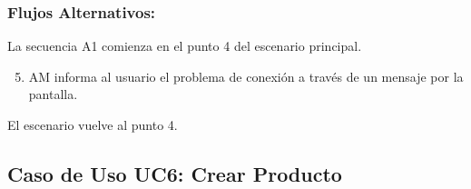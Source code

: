 \begin{framed}
\subsubsection{Flujos Alternativos: }

La secuencia A1 comienza en el punto 4 del escenario principal.
\begin{enumerate}
    \setcounter{enumi}{4}
    \item AM informa al usuario el problema de conexión a través de un mensaje por la pantalla.
\end{enumerate}
El escenario vuelve al punto 4.

\end{framed}



\subsection{Caso de Uso UC6: Crear Producto}

